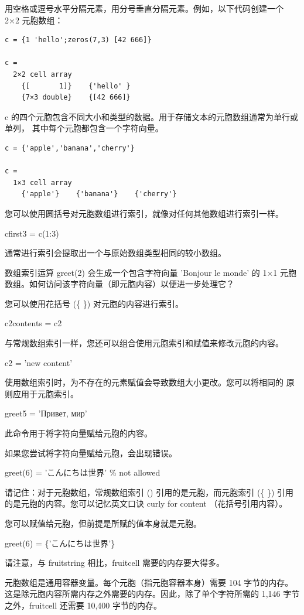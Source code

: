 \documentclass[12pt,a4paper]{article}
\begin{document}
用空格或逗号水平分隔元素，用分号垂直分隔元素。例如，以下代码创建一个 2×2 
元胞数组：

\begin{lstlisting}
c = {1 'hello';zeros(7,3) [42 666]}

c =
  2×2 cell array
    {[       1]}    {'hello' }
    {7×3 double}    {[42 666]}
\end{lstlisting}

c 的四个元胞包含不同大小和类型的数据。用于存储文本的元胞数组通常为单行或单列，
其中每个元胞都包含一个字符向量。

\begin{lstlisting}
c = {'apple','banana','cherry'}

c =
  1×3 cell array
    {'apple'}    {'banana'}    {'cherry'}
\end{lstlisting}

您可以使用圆括号对元胞数组进行索引，就像对任何其他数组进行索引一样。

cfirst3 = c(1:3)

通常进行索引会提取出一个与原始数组类型相同的较小数组。

数组索引运算 greet(2) 会生成一个包含字符向量 'Bonjour le monde' 的
 1×1 元胞数组。如何访问该字符向量（即元胞内容）以便进一步处理它？

您可以使用花括号 (\{ \}) 对元胞的内容进行索引。

c2contents = c{2}

与常规数组索引一样，您还可以组合使用元胞索引和赋值来修改元胞的内容。

c{2} = 'new content'

使用数组索引时，为不存在的元素赋值会导致数组大小更改。您可以将相同的
原则应用于元胞索引。

greet{5} = 'Привет, мир'

此命令用于将字符向量赋给元胞的内容。

如果您尝试将字符向量赋给元胞，会出现错误。

greet(6) = 'こんにちは世界'  \% not allowed

请记住：对于元胞数组，常规数组索引 (\( \)) 引用的是元胞，而元胞索引 
(\{ \}) 引用的是元胞的内容。您可以记忆英文口诀 curly for content
（花括号引用内容）。

您可以赋值给元胞，但前提是所赋的值本身就是元胞。

greet(6) = \{'こんにちは世界'\}


请注意，与 fruitstring 相比，fruitcell 需要的内存要大得多。

元胞数组是通用容器变量。每个元胞（指元胞容器本身）需要 104 字节的内存。
这是除元胞内容所需内存之外需要的内存。因此，除了单个字符所需的 1,146 
字节之外，fruitcell 还需要 10,400 字节的内存。
\end{document}

